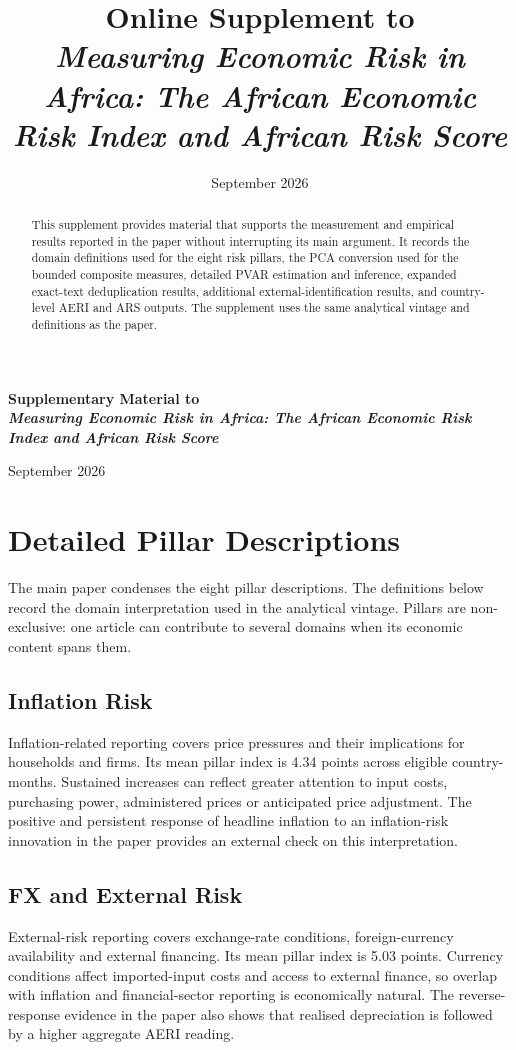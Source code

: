 \documentclass[11pt]{article}
\title{Online Supplement to\\[4pt]\textit{Measuring Economic Risk in Africa: The African Economic Risk Index and African Risk Score}}
\author{}
\date{September 2026}
\begin{document}
\renewcommand{\thetable}{S\arabic{table}}
\renewcommand{\thefigure}{S\arabic{figure}}
\renewcommand{\theequation}{S\arabic{equation}}
\begin{center}
{\Large\bfseries Supplementary Material to\\[4pt]\textit{Measuring Economic Risk in Africa: The African Economic Risk Index and African Risk Score}\par}
\vspace{.35cm}September 2026
\end{center}
\begin{abstract}\singlespacing
This supplement provides material that supports the measurement and empirical results reported in the paper without interrupting its main argument. It records the domain definitions used for the eight risk pillars, the PCA conversion used for the bounded composite measures, detailed PVAR estimation and inference, expanded exact-text deduplication results, additional external-identification results, and country-level AERI and ARS outputs. The supplement uses the same analytical vintage and definitions as the paper.
\end{abstract}
\tableofcontents
\clearpage

\section{Detailed Pillar Descriptions}
The main paper condenses the eight pillar descriptions. The definitions below record the domain interpretation used in the analytical vintage. Pillars are non-exclusive: one article can contribute to several domains when its economic content spans them.

\subsection{Inflation Risk}
Inflation-related reporting covers price pressures and their implications for households and firms. Its mean pillar index is 4.34 points across eligible country-months. Sustained increases can reflect greater attention to input costs, purchasing power, administered prices or anticipated price adjustment. The positive and persistent response of headline inflation to an inflation-risk innovation in the paper provides an external check on this interpretation.

\subsection{FX and External Risk}
External-risk reporting covers exchange-rate conditions, foreign-currency availability and external financing. Its mean pillar index is 5.03 points. Currency conditions affect imported-input costs and access to external finance, so overlap with inflation and financial-sector reporting is economically natural. The reverse-response evidence in the paper also shows that realised depreciation is followed by a higher aggregate AERI reading.
\end{document}
